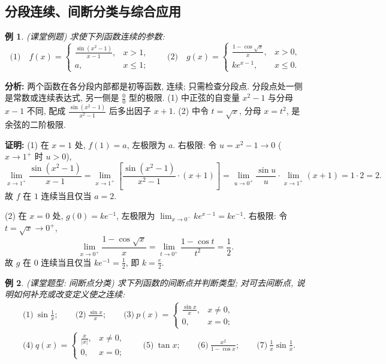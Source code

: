 \documentclass[UTF8,openany]{ctexbook}
\theoremstyle{chinesetextbook}
\newtheorem{example}{例}[section]
\newenvironment{cnproof}{\par\indent\textbf{证明:} \ignorespaces}{\par}
\begin{document}
\subsection{分段连续、间断分类与综合应用}
\begin{example}
\textnormal{(课堂例题)} 求使下列函数连续的参数:
\[
\text{(1)}\quad f(x)=\begin{cases}\frac{\sin(x^2-1)}{x-1},&x>1,\\a,&x\le1;\end{cases}
\qquad
\text{(2)}\quad g(x)=\begin{cases}\frac{1-\cos\sqrt x}{x},&x>0,\\ke^{x-1},&x\le0.\end{cases}
\]
\end{example}
\par\indent\textbf{分析:} 两个函数在各分段内部都是初等函数, 连续; 只需检查分段点. 分段点处一侧是常数或连续表达式, 另一侧是 $\displaystyle\frac00$ 型的极限. (1) 中正弦的自变量 $x^2-1$ 与分母 $x-1$ 不同, 配成 $\displaystyle\frac{\sin(x^2-1)}{x^2-1}$ 后多出因子 $x+1$. (2) 中令 $t=\sqrt x$, 分母 $x=t^2$, 是余弦的二阶极限.
\begin{cnproof}
(1) 在 $x=1$ 处, $f(1)=a$, 左极限为 $a$. 右极限: 令 $u=x^2-1\to0$ ($x\to1^+$ 时 $u>0$),
\[
\lim_{x\to1^+}\frac{\sin(x^2-1)}{x-1}
=\lim_{x\to1^+}\left[\frac{\sin(x^2-1)}{x^2-1}\cdot(x+1)\right]
=\lim_{u\to0^+}\frac{\sin u}u\cdot\lim_{x\to1^+}(x+1)=1\cdot2=2.
\]
故 $f$ 在 $1$ 连续当且仅当 $a=2$.

(2) 在 $x=0$ 处, $g(0)=ke^{-1}$, 左极限为 $\displaystyle\lim_{x\to0^-}ke^{x-1}=ke^{-1}$. 右极限: 令 $t=\sqrt x\to0^+$,
\[
\lim_{x\to0^+}\frac{1-\cos\sqrt x}x=\lim_{t\to0^+}\frac{1-\cos t}{t^2}=\frac12.
\]
故 $g$ 在 $0$ 连续当且仅当 $\displaystyle ke^{-1}=\frac12$, 即 $\displaystyle k=\frac e2$.
\end{cnproof}
\begin{example}
\textnormal{(课堂题型: 间断点分类)} 求下列函数的间断点并判断类型; 对可去间断点, 说明如何补充或改变定义使之连续:
\[
\begin{aligned}
&\text{(1)}\ \sin\frac1x;\qquad
\text{(2)}\ \frac{\sin x}{x};\qquad
\text{(3)}\ p(x)=\begin{cases}\frac{\sin x}{x},&x\ne0,\\0,&x=0;\end{cases}\\
&\text{(4)}\ q(x)=\begin{cases}\frac{x}{|x|},&x\ne0,\\0,&x=0;\end{cases}\qquad
\text{(5)}\ \tan x;\qquad
\text{(6)}\ \frac{x^2}{1-\cos x};\qquad
\text{(7)}\ \frac1x\sin\frac1x.
\end{aligned}
\]
\end{example}
\end{document}
